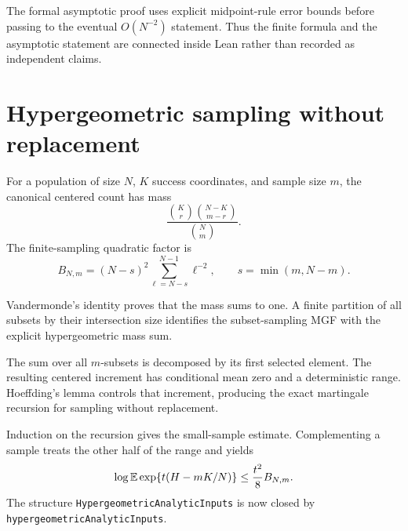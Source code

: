 The formal asymptotic proof uses explicit midpoint-rule error bounds before
passing to the eventual \(O(N^{-2})\) statement.  Thus the finite formula and
the asymptotic statement are connected inside Lean rather than recorded as
independent claims.

\section{Hypergeometric sampling without replacement}

\begin{definition}
For a population of size \(N\), \(K\) success coordinates, and sample size
\(m\), the canonical centered count has mass
\[
  \frac{\binom Kr\binom{N-K}{m-r}}{\binom Nm}.
\]
The finite-sampling quadratic factor is
\[
  B_{N,m}=(N-s)^2\sum_{\ell=N-s}^{N-1}\ell^{-2},
  \qquad s=\min(m,N-m).
\]
\end{definition}

\begin{lemma}
Vandermonde's identity proves that the mass sums to one.  A finite partition
of all subsets by their intersection size identifies the subset-sampling MGF
with the explicit hypergeometric mass sum.
\end{lemma}

\begin{lemma}
\label{lem:sampling-recursion}
The sum over all \(m\)-subsets is decomposed by its first selected element.
The resulting centered increment has conditional mean zero and a deterministic
range.  Hoeffding's lemma controls that increment, producing the exact
martingale recursion for sampling without replacement.
\end{lemma}

\begin{theorem}
\label{thm:hypergeom}
Induction on the recursion gives the small-sample estimate.  Complementing a
sample treats the other half of the range and yields
\[
  \log\mathbb{E}\exp\{t(H-mK/N)\}\le\frac{t^2}{8}B_{N,m}.
\]
The structure \texttt{HypergeometricAnalyticInputs} is now closed by
\texttt{hypergeometricAnalyticInputs}.
\end{theorem}

